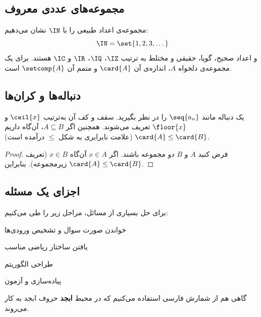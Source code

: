 
\subsection{مجموعه‌های عددی معروف}
مجموعه‌ی اعداد طبیعی را با $\IN$ نشان می‌دهیم:
\[
	\IN = \set{1, 2, 3, \dots}
\]
و اعداد صحیح، گویا، حقیقی و مختلط به ترتیب $\IZ$، $\IQ$، $\IR$ و $\IC$ هستند.
برای یک مجموعه‌ی دلخواه $A$، اندازه‌ی آن $\card{A}$ و متمم آن $\setcomp{A}$ است.

\subsection{دنباله‌ها و کران‌ها}
یک دنباله مانند $\seq{a_n}$ را در نظر بگیرید. سقف و کف آن به‌ترتیب
$\ceil{x}$ و $\floor{x}$ تعریف می‌شوند. همچنین اگر $A \subseteq B$، آن‌گاه داریم
$\card{A} \leq \card{B}$ (علامت نابرابری به شکل $\leqslant$ درآمده است).

\begin{proof}
	فرض کنید $A$ و $B$ دو مجموعه باشند. اگر $x \in A$ آن‌گاه $x \in B$
	(تعریف زیرمجموعه). بنابراین $\card{A} \le \card{B}$.
\end{proof}

\subsection{اجزای یک مسئله}
برای حل بسیاری از مسائل، مراحل زیر را طی می‌کنیم:
\begin{ابجد}
\item خواندن صورت سوال و تشخیص ورودی‌ها
\item یافتن ساختار ریاضی مناسب
\item طراحی الگوریتم
\item پیاده‌سازی و آزمون
\end{ابجد}

گاهی هم از شمارش  فارسی استفاده می‌کنیم که در محیط \textbf{ابجد} حروف ابجد به کار می‌روند.